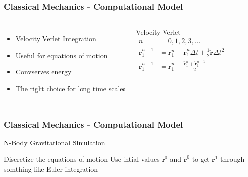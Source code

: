 \documentclass{beamer}
\begin{document}
\begin{frame}
    \frametitle{Classical Mechanics - Computational Model}

    \begin{columns}
            \begin{itemize}
                \item Velocity Verlet Integration
                \item Useful for equations of motion
                \item Convserves energy
                \item The right choice for long time scales
            \end{itemize}
            \centering Velocity Verlet
            \begin{align*}
                n &= 0, 1, 2, 3, \ldots \\
                \mathbf{r}_1^{n + 1} &= \mathbf{r}_1^n + \dot{\mathbf{r}}_1^n \Delta t + \frac{1}{2} \ddot{\mathbf{r}} \Delta t^2 \\
                \dot{\mathbf{r}}_1^{n + 1} &= \dot{\mathbf{r}}_1^n + \frac{\ddot{\mathbf{r}}_1^n + \ddot{\mathbf{r}}_1^{n  +1}}{2}
            \end{align*}
    \end{columns}
\end{frame}

\begin{frame}
    \frametitle{Classical Mechanics - Computational Model}

    \small \begin{algorithm}[H] \DontPrintSemicolon
        \caption{N-Body Gravitational Simulation} \label{alg:nbody}
        Discretize the equations of motion\;
        Use intial values $\mathbf{r}^0$ and $\dot{\mathbf{r}}^0$ to get $\mathbf{r}^1$ through somthing like Euler integration\;
    \end{algorithm}
\end{frame}
\end{document}
